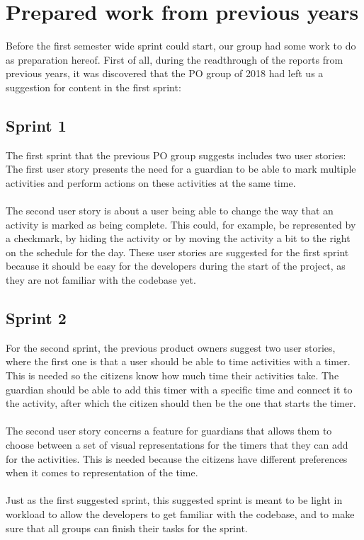 \section{Prepared work from previous years}\label{suggested-work}
Before the first semester wide sprint could start, our group had some work to do as preparation hereof.
First of all, during the readthrough of the reports from previous years, it was discovered that the PO group of 2018 had left us a suggestion for content in the first sprint:

\subsection{Sprint 1}
The first sprint that the previous PO group suggests includes two user stories:
The first user story presents the need for a guardian to be able to mark multiple activities and perform actions on these activities at the same time.
\\\\
The second user story is about a user being able to change the way that an activity is marked as being complete.
This could, for example, be represented by a checkmark, by hiding the activity or by moving the activity a bit to the right on the schedule for the day.
These user stories are suggested for the first sprint because it should be easy for the developers during the start of the project, as they are not familiar with the codebase yet.

\subsection{Sprint 2}
For the second sprint, the previous product owners suggest two user stories, where the first one is that a user should be able to time activities with a timer.
This is needed so the citizens know how much time their activities take.
The guardian should be able to add this timer with a specific time and connect it to the activity, after which the citizen should then be the one that starts the timer.
\\\\
The second user story concerns a feature for guardians that allows them to choose between a set of visual representations for the timers that they can add for the activities.
This is needed because the citizens have different preferences when it comes to representation of the time.
\\\\
Just as the first suggested sprint, this suggested sprint is meant to be light in workload to allow the developers to get familiar with the codebase, and to make sure that all groups can finish their tasks for the sprint.

